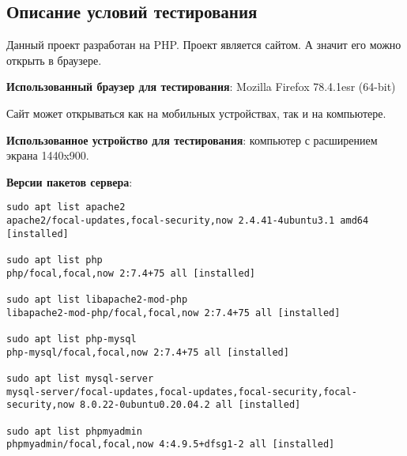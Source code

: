 \subsection{Описание условий тестирования}

Данный проект разработан на PHP. Проект является сайтом. А значит его можно открыть в браузере.

\textbf{Использованный браузер для тестирования}: Mozilla Firefox 78.4.1esr (64-bit)

Сайт может открываться как на мобильных устройствах, так и на компьютере.

\textbf{Использованное устройство для тестирования}: компьютер с расширением экрана 1440x900.

\textbf{Версии пакетов сервера}:

\begin{lstlisting}[breaklines=true]
sudo apt list apache2
apache2/focal-updates,focal-security,now 2.4.41-4ubuntu3.1 amd64 [installed]

sudo apt list php
php/focal,focal,now 2:7.4+75 all [installed]

sudo apt list libapache2-mod-php
libapache2-mod-php/focal,focal,now 2:7.4+75 all [installed]

sudo apt list php-mysql
php-mysql/focal,focal,now 2:7.4+75 all [installed]

sudo apt list mysql-server
mysql-server/focal-updates,focal-updates,focal-security,focal-security,now 8.0.22-0ubuntu0.20.04.2 all [installed]

sudo apt list phpmyadmin
phpmyadmin/focal,focal,now 4:4.9.5+dfsg1-2 all [installed]
\end{lstlisting}